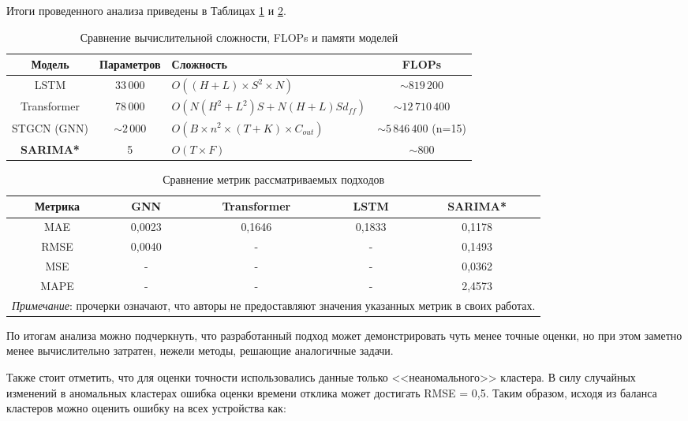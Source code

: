 Итоги проведенного анализа приведены в Таблицах \ref{tab:compare} и \ref{tab:compare2}.


\begin{table}[ht]
	\centering
	\caption{Сравнение вычислительной сложности, FLOPs и памяти моделей}
	\begin{tabular}{|c|c|>{\centering\arraybackslash}p{4.5cm}|c|}
		\hline
		\textbf{Модель} & \textbf{Параметров} & \textbf{Сложность} & \textbf{FLOPs} \\
		\hline
		LSTM & 33\,000 & $O((H+L) \times S^2 \times N)$ & $\sim819\,200$ \\ 
		\hline
		Transformer & 78\,000 & $O(N(H^2+L^2)S + N(H+L)S d_{ff})$ & $\sim12\,710\,400$ \\
		\hline
		STGCN (GNN) & $\sim2\,000$ & $O(B \times n^2 \times (T+K) \times C_{out})$ & $\sim5\,846\,400$ (n=15) \\ 
		\hline
		\textbf{SARIMA*} & 5 & $O(T \times F)$ & $\sim800$ \\
		\hline
	\end{tabular}
	\label{tab:compare}
\end{table}




\begin{table}[ht]
	\centering
	\caption{Сравнение метрик рассматриваемых подходов}
	\begin{tabular}{|c|c|c|c|c|}
		\hline
		Метрика & GNN\cite{ge2022gnn} & Transformer\cite{lstm_trans} & LSTM\cite{lstm_trans} & SARIMA* \\ 
		\hline
		MAE & 0,0023 & 0,1646 & 0,1833 & 0,1178  \\
		\hline
		RMSE & 0,0040 & - & - & 0,1493  \\ 
		\hline
		MSE & - & - & - & 0,0362  \\ 
		\hline
		MAPE & - & - & - & 2,4573  \\ 
		\hline
		\multicolumn{5}{|p{14cm}|}{\textit{Примечание}: прочерки означают, что авторы не предоставляют значения указанных метрик в своих работах.} \\
		\hline
	\end{tabular}
	\label{tab:compare2}
\end{table}

По итогам анализа можно подчеркнуть, что разработанный подход может демонстрировать чуть менее точные оценки, но при этом заметно менее вычислительно затратен, нежели методы, решающие аналогичные задачи.


Также стоит отметить, что для оценки точности использовались данные только <<неаномального>> кластера. В силу случайных изменений в аномальных кластерах ошибка оценки времени отклика может достигать RMSE = 0,5. Таким образом, исходя из баланса кластеров можно оценить ошибку на всех устройства как:

